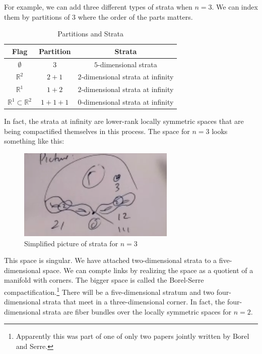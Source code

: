 \documentclass[leqno, openany]{memoir}
\theoremstyle{definition}
\theoremstyle{remark}
\theoremstyle{plain}
\theoremstyle{definition}
\theoremstyle{remark}
\newcommand{\R}{\mathbb{R}}
\begin{document}
For example, we can add three different types of strata when $n=3$. We can index them by partitions of $3$ where the order of the parts matters.
\begin{table}[H]
    \centering
    \caption{Partitions and Strata}
    \label{tab:label}
    \begin{tabular}{ccc}
    \toprule
    Flag & Partition & Strata \\
    \midrule
    $\emptyset$ & $3$ & $5$-dimensional strata \\
    $\R^2$ & $2+1$ & $2$-dimensional strata at infinity \\
    $\R^1$ & $1+2$ & $2$-dimensional strata at infinity \\
    $\R^1 \subset \R^2$ & $1+1+1$ & $0$-dimensional strata at infinity \\
    \bottomrule
    \end{tabular}
\end{table}
In fact, the strata at infinity are lower-rank locally symmetric spaces that are being compactified themselves in this process. The space for $n=3$ looks something like this:
\begin{figure}[H]
    \centering
    \includegraphics[width=0.8\linewidth]{space.png}
    \caption{Simplified picture of strata for $n=3$}%
    \label{fig:Simplifi}
\end{figure}
This space is singular. We have attached two-dimensional strata to a five-dimensional space. We can compte links by realizing the space as a quotient of a manifold with corners. The bigger space is called the Borel-Serre compactification.\footnote{Apparently this was part of one of only two papers jointly written by Borel and Serre.} There will be a five-dimensional stratum and two four-dimensional strata that meet in a three-dimensional corner. In fact, the four-dimensional strata are fiber bundles over the locally symmetric spaces for $n=2$.
\end{document}
